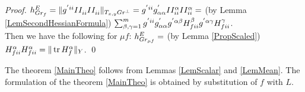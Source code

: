\documentclass{llncs}
\newcommand {\tr}{{\,}\mathrm{tr}{\,}}
\begin{document}
\begin{proof}
$\tensor*{h}{^E_{Gr_f}} = \| g^{'ii} \tensor*{II}{_i_i} \tensor*{II}{_i_i} \|_{T_{x, y}Gr^{\bot}}
= g^{'ii} g^{'}_{\alpha \alpha} \tensor*{II}{^\alpha _i_i} \tensor*{II}{^\alpha _i_i} = $ (by Lemma \ref{LemSecondHessianFormula}) 
$\sum_{\beta, \gamma = 1}^{m} g^{'ii} g^{'}_{\alpha \alpha} g^{'\alpha\beta} \tensor*{H}{_f^\beta _i_i} g^{'\alpha\gamma} \tensor*{H}{_f^\gamma _i_i}$.
\\
Then we have the following for $\mu f$:
$\tensor*{h}{^E_{Gr_{\mu f}}} 
=$ (by Lemma \ref{PropScaled}) $\tensor*{H}{_f^\alpha _i_i} \tensor*{H}{_f^\alpha _i_i}
= \|\tr H_f^\alpha\|_Y$.
\qed
\end{proof}

The theorem \ref{MainTheo} follows from Lemmas \ref{LemScalar} and \ref{LemMean}. The formulation of the theorem \ref{MainTheo} is obtained by substitution of $f$ with $L$.
\end{document}
